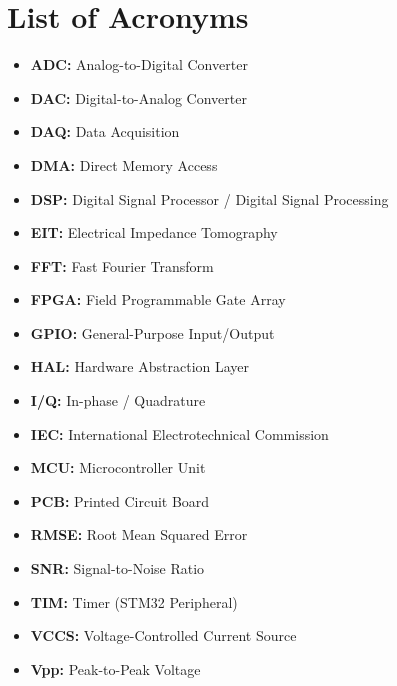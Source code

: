 \chapter*{List of Acronyms}


\vspace{0.5cm}
\begin{itemize}
    \item \textbf{ADC:} Analog-to-Digital Converter
    \item \textbf{DAC:} Digital-to-Analog Converter
    \item \textbf{DAQ:} Data Acquisition
    \item \textbf{DMA:} Direct Memory Access
    \item \textbf{DSP:} Digital Signal Processor / Digital Signal Processing
    \item \textbf{EIT:} Electrical Impedance Tomography
    \item \textbf{FFT:} Fast Fourier Transform
    \item \textbf{FPGA:} Field Programmable Gate Array
    \item \textbf{GPIO:} General-Purpose Input/Output
    \item \textbf{HAL:} Hardware Abstraction Layer
    \item \textbf{I/Q:} In-phase / Quadrature
    \item \textbf{IEC:} International Electrotechnical Commission
    \item \textbf{MCU:} Microcontroller Unit
    \item \textbf{PCB:} Printed Circuit Board
    \item \textbf{RMSE:} Root Mean Squared Error
    \item \textbf{SNR:} Signal-to-Noise Ratio
    \item \textbf{TIM:} Timer (STM32 Peripheral)
    \item \textbf{VCCS:} Voltage-Controlled Current Source
    \item \textbf{Vpp:} Peak-to-Peak Voltage
\end{itemize}
\normalsize
